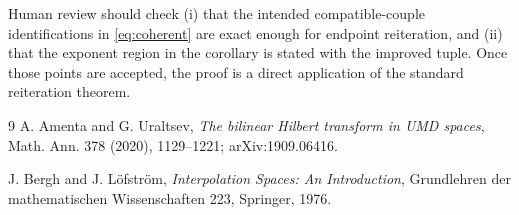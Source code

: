 \documentclass[11pt]{article}
\theoremstyle{definition}
\begin{document}
Human review should check (i) that the intended compatible-couple
identifications in \eqref{eq:coherent} are exact enough for endpoint
reiteration, and (ii) that the exponent region in the corollary is stated with
the improved tuple.  Once those points are accepted, the proof is a direct
application of the standard reiteration theorem.

\begin{thebibliography}{9}
A. Amenta and G. Uraltsev,
\emph{The bilinear Hilbert transform in UMD spaces},
Math. Ann. 378 (2020), 1129--1221; arXiv:1909.06416.

J. Bergh and J. L\"ofstr\"om,
\emph{Interpolation Spaces: An Introduction},
Grundlehren der mathematischen Wissenschaften 223, Springer, 1976.
\end{thebibliography}
\end{document}
